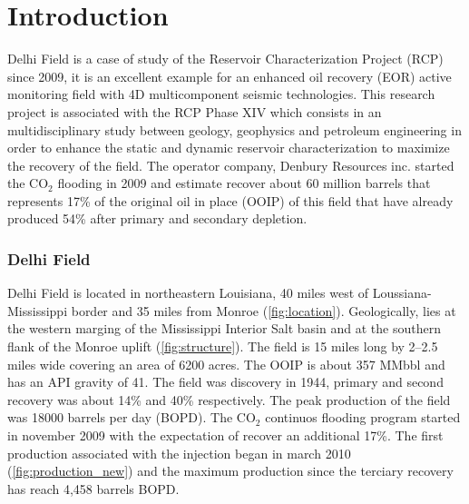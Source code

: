 \chapter{Introduction}
Delhi Field is a case of study of the Reservoir Characterization Project (RCP)
since 2009, it is an excellent example for an enhanced oil recovery (EOR) 
active monitoring field with 4D multicomponent seismic technologies. This research
project is associated with the RCP Phase XIV which consists in an multidisciplinary study 
between geology, geophysics and petroleum engineering in order to enhance the 
static and dynamic reservoir characterization to maximize the recovery of the field. 
The operator company, Denbury Resources inc. started the CO$_2$ flooding in 2009 and estimate
recover about 60 million barrels that represents 17\% of the original oil in place
(OOIP) of this field that have already produced 54\% after primary and secondary depletion.


\subsection{Delhi Field}

Delhi Field is located in northeastern Louisiana, 40 miles west of 
Loussiana-Mississippi border and 35 miles from Monroe (\ref{fig:location}).
Geologically, lies at the western marging of the Mississippi Interior Salt basin
\cite{ref:alam} and at the southern flank of the Monroe uplift \cite{ref:bloomer} 
(\ref{fig:structure}). The field is 15 miles long by 2--2.5 miles wide covering an
area of 6200 acres. The OOIP is about 357 MMbbl and has an API gravity of 41. 
The field was discovery in 1944, primary and second recovery was about 14\% and 40\%
respectively. The peak production of the field was 18000 barrels per day (BOPD). 
The CO$_2$ continuos flooding program started in november 2009 with the expectation
 of recover an additional 17\%. The first production associated with the injection began
 in march 2010 (\ref{fig:production_new}) and the maximum production since the terciary 
recovery has reach 4,458 barrels BOPD. 





